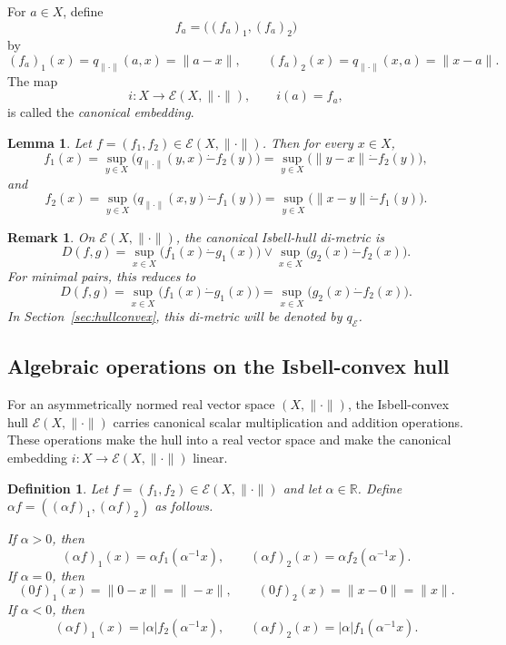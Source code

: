 \documentclass[preprint,12pt]{elsarticle}
\numberwithin{equation}{section}
\newtheorem{lemma}[theorem]{Lemma}
\newtheorem{definition}[theorem]{Definition}
\newtheorem{remark}[theorem]{Remark}
\newcommand{\E}{\mathcal{E}}
\begin{document}
For \(a\in X\), define
\[
f_a=\bigl((f_a)_1,(f_a)_2\bigr)
\]
by
\[
(f_a)_1(x)=q_{\|\cdot\|}(a,x)=\|a-x\|,
\qquad
(f_a)_2(x)=q_{\|\cdot\|}(x,a)=\|x-a\|.
\]
The map
\[
i:X\longrightarrow \E(X,\|\cdot\|),
\qquad
i(a)=f_a,
\]
is called the \emph{canonical embedding}.

\begin{lemma}\label{lem:suprep}
Let \(f=(f_1,f_2)\in\E(X,\|\cdot\|)\).  Then for every \(x\in X\),
\[
f_1(x)
=
\sup_{y\in X}
\bigl(q_{\|\cdot\|}(y,x)\dot{-}f_2(y)\bigr)
=
\sup_{y\in X}
\bigl(\|y-x\|\dot{-}f_2(y)\bigr),
\]
and
\[
f_2(x)
=
\sup_{y\in X}
\bigl(q_{\|\cdot\|}(x,y)\dot{-}f_1(y)\bigr)
=
\sup_{y\in X}
\bigl(\|x-y\|\dot{-}f_1(y)\bigr).
\]
\end{lemma}

\begin{remark}\label{rem:IsbellD}
On \(\E(X,\|\cdot\|)\), the canonical Isbell-hull di-metric is
\[
D(f,g)
=
\sup_{x\in X}\bigl(f_1(x)\dot{-}g_1(x)\bigr)
\vee
\sup_{x\in X}\bigl(g_2(x)\dot{-}f_2(x)\bigr).
\]
For minimal pairs, this reduces to
\[
D(f,g)
=
\sup_{x\in X}\bigl(f_1(x)\dot{-}g_1(x)\bigr)
=
\sup_{x\in X}\bigl(g_2(x)\dot{-}f_2(x)\bigr).
\]
In Section~\ref{sec:hullconvex}, this di-metric will be denoted by \(q_{\E}\).
\end{remark}

\subsection{Algebraic operations on the Isbell-convex hull}
\label{subsec:ops}

For an asymmetrically normed real vector space \((X,\|\cdot\|)\), the
Isbell-convex hull \(\E(X,\|\cdot\|)\) carries canonical scalar multiplication
and addition operations.  These operations make the hull into a real vector
space and make the canonical embedding \(i:X\to\E(X,\|\cdot\|)\) linear.

\begin{definition}\label{def:scalarHull}
Let \(f=(f_1,f_2)\in\E(X,\|\cdot\|)\) and let \(\alpha\in\mathbb R\).  Define
\(\alpha f=((\alpha f)_1,(\alpha f)_2)\) as follows.

If \(\alpha>0\), then
\[
(\alpha f)_1(x)=\alpha f_1(\alpha^{-1}x),
\qquad
(\alpha f)_2(x)=\alpha f_2(\alpha^{-1}x).
\]
If \(\alpha=0\), then
\[
(0f)_1(x)=\|0-x\|=\|-x\|,
\qquad
(0f)_2(x)=\|x-0\|=\|x\|.
\]
If \(\alpha<0\), then
\[
(\alpha f)_1(x)=|\alpha| f_2(\alpha^{-1}x),
\qquad
(\alpha f)_2(x)=|\alpha| f_1(\alpha^{-1}x).
\]
\end{definition}
\end{document}
